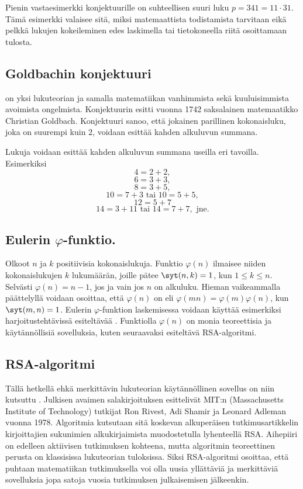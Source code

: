 Pienin vastaesimerkki konjektuurille on suhteellisen suuri luku $p=341 = 11\cdot 31$. Tämä esimerkki valaisee sitä, miksi matemaattista todistamista tarvitaan eikä pelkkä lukujen kokeileminen edes laskimella tai tietokoneella riitä osoittamaan tulosta.


\subsection*{Goldbachin konjektuuri}
 on yksi lukuteorian ja samalla matematiikan vanhimmista sekä kuuluisimmista avoimista ongelmista. Konjektuurin esitti vuonna 1742 saksalainen mate\-maa\-tik\-ko Christian Goldbach. Konjektuuri sanoo, että jokainen parillinen kokonaisluku, joka on suurempi kuin $2$, voidaan esittää kahden alkuluvun summana. 

Lukuja voidaan esittää kahden alkuluvun summana useilla eri tavoilla. Esimerkiksi
\[
  4 = 2 + 2,
\]
\[
  6 = 3 + 3,
\]
\[
  8 = 3 + 5,
\]
\[
10 = 7 + 3\textrm{ tai } 10=5 + 5,
\]
\[
12 = 5 + 7
\]
\[
14 = 3 + 11\textrm{ tai }14 =7 + 7, \textrm{ jne.}
\]

\subsection*{Eulerin $\varphi$-funktio.} 
Olkoot $n$ ja $k$ positiivisia kokonaislukuja. Funktio $\varphi(n)$ ilmaisee niiden kokonaislukujen $k$ lukumäärän, joille pätee  $\syt(n, k) = 1$, kun $1\le k \le n$. Selvästi $\varphi(n)=n-1$, jos ja vain jos $n$ on alkuluku. Hieman vaikeammalla päättelyllä voidaan osoittaa, että $\varphi(n)$ on  eli $\varphi(mn)=\varphi(m)\varphi(n)$, kun $\syt(m,n)=1$.
Eulerin $\varphi$-funktion laskemisessa voidaan käyttää esimerkiksi harjoitustehtävissä esiteltävää . Funktiolla $\varphi(n)$ on monia teoreettisia ja käy\-tän\-nöl\-li\-siä sovelluksia, kuten seuraavaksi esiteltävä RSA-algoritmi.

\subsection*{RSA-algoritmi} Tällä hetkellä ehkä merkittävin lukuteorian käy\-tän\-nöl\-li\-nen sovellus on niin kutsuttu . Julkisen avaimen salakirjoituksen esittelivät MIT:n (Massachusetts Institute of Technology) tutkijat Ron Rivest, Adi Shamir ja Leonard Adleman vuonna 1978. Algoritmia kutsutaan sitä koskevan alkuperäisen tutkimusartikkelin kirjoittajien sukunimien alkukirjaimista muodostetulla lyhenteellä RSA. Aihepiiri on edelleen aktiivisen tutkimuksen kohteena, mutta algoritmin teoreettinen perusta on klassisissa lukuteorian tuloksissa. Siksi RSA-algoritmi osoittaa, että puhtaan matematiikan tutkimuksella voi olla uusia yllättäviä ja merkittäviä sovelluksia jopa satoja vuosia tutkimuksen julkaisemisen jälkeenkin.

